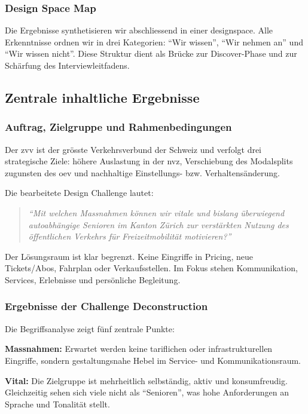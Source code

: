 \subsubsection{Design Space Map}
Die Ergebnisse synthetisieren wir abschliessend in einer \gls{designspace}.
Alle Erkenntnisse ordnen wir in drei Kategorien: ``Wir wissen'', ``Wir nehmen an'' und ``Wir wissen nicht''.
Diese Struktur dient als Brücke zur Discover-Phase und zur Schärfung des Interviewleitfadens.

\newpage
\subsection{Zentrale inhaltliche Ergebnisse}

\subsubsection{Auftrag, Zielgruppe und Rahmenbedingungen}
Der \gls{zvv} ist der grösste Verkehrsverbund der Schweiz und verfolgt drei strategische Ziele: höhere Auslastung in der \gls{nvz}, Verschiebung des Modalsplits zugunsten des \gls{oev} und nachhaltige Einstellungs- bzw. Verhaltensänderung.

Die bearbeitete Design Challenge lautet:

\begin{quote}
\textit{``Mit welchen Massnahmen können wir vitale und bislang überwiegend autoabhängige Senioren im Kanton Zürich zur verstärkten Nutzung des öffentlichen Verkehrs für Freizeitmobilität motivieren?''}
\end{quote}

Der Lösungsraum ist klar begrenzt.
Keine Eingriffe in Pricing, neue Tickets/Abos, Fahrplan oder Verkaufsstellen.
Im Fokus stehen Kommunikation, Services, Erlebnisse und persönliche Begleitung.

\subsubsection{Ergebnisse der Challenge Deconstruction}
Die Begriffsanalyse zeigt fünf zentrale Punkte:

\textbf{Massnahmen:} Erwartet werden keine tariflichen oder infrastrukturellen Eingriffe, sondern gestaltungsnahe Hebel im Service- und Kommunikationsraum.

\textbf{Vital:} Die Zielgruppe ist mehrheitlich selbständig, aktiv und konsumfreudig.
Gleichzeitig sehen sich viele nicht als ``Senioren'', was hohe Anforderungen an Sprache und Tonalität stellt.

